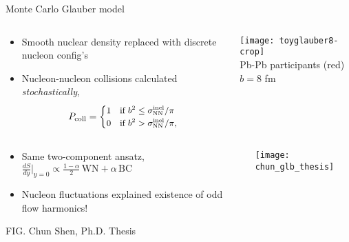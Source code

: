 \documentclass[svgnames]{beamer}
\begin{document}
\begin{frame}{Monte Carlo Glauber model}
 \begin{columns}[T]
  \begin{column}{0.5\textwidth}
   \begin{itemize}
    \item Smooth nuclear density replaced with discrete nucleon config's
    \vspace{0.1 in}
    \item Nucleon-nucleon collisions calculated \emph{stochastically},
    \begin{equation}
    \small
    P_\text{coll}=
    \begin{cases}
    1 &\mbox{if } b^2 \le \sigma^\text{inel}_\text{NN}/\pi \\ 
    0 &\mbox{if } b^2 > \sigma^\text{inel}_\text{NN}/\pi, \nonumber
    \end{cases}
    \end{equation}
   \end{itemize}
  \end{column}
  
  \begin{column}{0.5\textwidth}
   \centering
   \vspace{-0.1 in}
   \texttt{[image: toyglauber8-crop]} \\
   \footnotesize Pb-Pb participants (red) $b=8$ fm
  \end{column}

 \end{columns}

 \vspace{0.1 in}
 
 \begin{columns}[T]
  \begin{column}{0.5\textwidth}
   \begin{itemize}
    \item Same two-component ansatz,\\
    \vspace{0.1 in}
    $\frac{dS}{dy} \big \vert_{y=0} \propto \frac{1-\alpha}{2}\, \text{WN} + \alpha\, \text{BC}$
    \vspace{0.1 in}
    \item Nucleon fluctuations explained existence of odd flow harmonics!
   \end{itemize}
   \centering
   \vspace{0.05 in}
   \footnotesize FIG. Chun Shen, Ph.D. Thesis
  \end{column}
  \begin{column}{0.5\textwidth}
  \centering
  \vspace{0.1 in}
  \texttt{[image: chun\_glb\_thesis]} 
  \end{column}
 \end{columns}

\end{frame}
\end{document}
